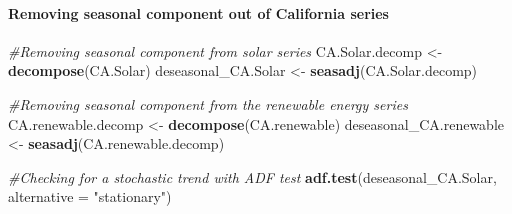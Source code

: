 \documentclass[12pt,]{article}
\newenvironment{Shaded}{\begin{snugshade}}{\end{snugshade}}
\newcommand{\KeywordTok}[1]{\textcolor[rgb]{0.13,0.29,0.53}{\textbf{#1}}}
\newcommand{\DataTypeTok}[1]{\textcolor[rgb]{0.13,0.29,0.53}{#1}}
\newcommand{\DecValTok}[1]{\textcolor[rgb]{0.00,0.00,0.81}{#1}}
\newcommand{\StringTok}[1]{\textcolor[rgb]{0.31,0.60,0.02}{#1}}
\newcommand{\CommentTok}[1]{\textcolor[rgb]{0.56,0.35,0.01}{\textit{#1}}}
\newcommand{\OperatorTok}[1]{\textcolor[rgb]{0.81,0.36,0.00}{\textbf{#1}}}
\newcommand{\NormalTok}[1]{#1}
\let\oldparagraph\paragraph
\renewcommand{\paragraph}[1]{\oldparagraph{#1}\mbox{}}
\begin{document}
\begin{Shaded}
\end{Shaded}

\paragraph{Removing seasonal component out of California
series}\label{removing-seasonal-component-out-of-california-series}

\begin{Shaded}
\begin{Highlighting}[]
\CommentTok{#Removing seasonal component from solar series}
\NormalTok{CA.Solar.decomp <-}\StringTok{ }\KeywordTok{decompose}\NormalTok{(CA.Solar)}
\NormalTok{deseasonal_CA.Solar <-}\StringTok{ }\KeywordTok{seasadj}\NormalTok{(CA.Solar.decomp) }

\CommentTok{#Removing seasonal component from the renewable energy series}
\NormalTok{CA.renewable.decomp <-}\StringTok{ }\KeywordTok{decompose}\NormalTok{(CA.renewable)}
\NormalTok{deseasonal_CA.renewable <-}\StringTok{ }\KeywordTok{seasadj}\NormalTok{(CA.renewable.decomp) }

\CommentTok{#Checking for a stochastic trend with ADF test}
\KeywordTok{adf.test}\NormalTok{(deseasonal_CA.Solar, }\DataTypeTok{alternative =} \StringTok{"stationary"}\NormalTok{)}
\end{Highlighting}
\end{Shaded}
\end{document}
